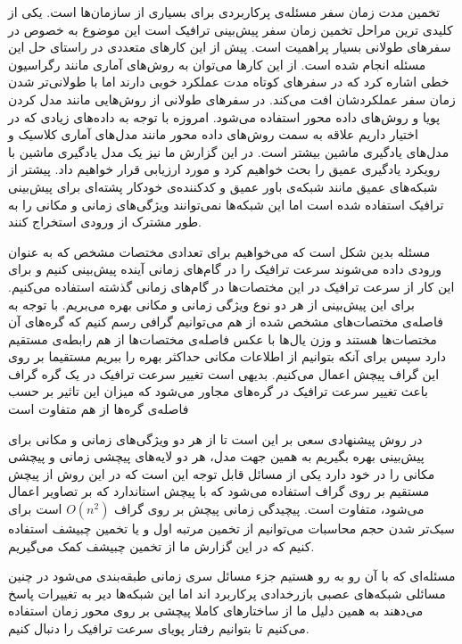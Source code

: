 
تخمین مدت زمان سفر مسئله‌ی پرکاربردی برای بسیاری از سازمان‌ها است. یکی از کلیدی ترین مراحل تخمین زمان سفر پیش‌بینی ترافیک است این موضوع به خصوص در سفرهای طولانی بسیار پراهمیت است. پیش از این کارهای متعددی در راستای حل این مسئله انجام شده است. از این کارها می‌توان به روش‌های آماری مانند رگراسیون خطی اشاره کرد که در سفرهای کوتاه مدت عملکرد خوبی دارند اما با طولانی‌تر شدن زمان سفر عملکردشان افت می‌کند. در سفرهای طولانی از روش‌هایی مانند مدل کردن پویا و روش‌های داده محور استفاده می‌شود. امروزه با توجه به داده‌های زیادی که در اختیار داریم علاقه به سمت روش‌های داده محور مانند مدل‌های آماری کلاسیک و مدل‌های یادگیری ماشین  بیشتر است. در این گزارش ما نیز یک مدل یادگیری ماشین با رویکرد یادگیری عمیق را بحث خواهیم کرد و مورد ارزیابی قرار خواهیم داد. پیشتر از شبکه‌های عمیق مانند شبکه‌ی باور عمیق و کدکننده‌ی خودکار پشته‌ای برای پیش‌بینی ترافیک استفاده شده است اما این شبکه‌ها نمی‌توانند ویژگی‌های زمانی و مکانی را به طور مشترک از ورودی استخراج کنند.

مسئله بدین شکل است که می‌خواهیم برای تعدادی مختصات مشخص که به عنوان ورودی داده می‌شوند سرعت ترافیک را در گام‌های زمانی آینده پیش‌بینی کنیم و برای این کار از سرعت ترافیک در این مختصات‌ها در گام‌های زمانی گذشته استفاده می‌کنیم. برای این پیش‌بینی از هر دو نوع ویژگی زمانی و مکانی بهره می‌بریم. با توجه به فاصله‌ی مختصات‌های مشخص شده از هم می‌توانیم گرافی رسم کنیم که گره‌های آن مختصات‌ها هستند و وزن یال‌ها با عکس فاصله‌ی مختصات‌ها از هم رابطه‌ی مستقیم دارد سپس برای آنکه بتوانیم از اطلاعات مکانی حداکثر بهره را ببریم مستقیما بر روی این گراف پیچش اعمال می‌کنیم. بدیهی است تغییر سرعت ترافیک در یک گره گراف باعث تغییر سرعت ترافیک در گره‌های مجاور می‌شود که میزان این تاثیر بر حسب فاصله‌ی گره‌ها از هم متفاوت است

در روش پیشنهادی سعی بر این است تا از هر دو ویژگی‌های زمانی و مکانی برای پیش‌بینی بهره بگیریم به همین جهت مدل، هر دو لایه‌های پیچشی زمانی و پیچشی مکانی را در خود دارد یکی از مسائل قابل توجه این است که در این روش از پیچش مستقیم بر روی گراف استفاده می‌شود که با پیچش استاندارد که بر تصاویر اعمال می‌شود، متفاوت است. پیچیدگی زمانی پیچش بر روی گراف $O(n^{2})$ است برای سبک‌تر شدن حجم محاسبات می‌توانیم از تخمین مرتبه اول و یا تخمین چبیشف استفاده کنیم که در این گزارش ما از تخمین چبیشف کمک می‌گیریم.

مسئله‌ای که با آن رو به رو هستیم جزء مسائل سری زمانی طبقه‌بندی می‌شود در چنین مسائلی شبکه‌های عصبی بازرخدادی پرکاربرد اند اما این شبکه‌ها دیر به تغییرات پاسخ می‌دهند به همین دلیل ما از ساختارهای کاملا پیچشی بر روی محور زمان استفاده می‌کنیم تا بتوانیم رفتار پویای سرعت ترافیک را دنبال کنیم.

